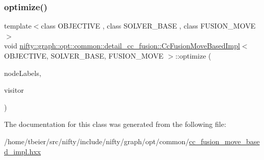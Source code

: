 \mbox{\label{classnifty_1_1graph_1_1opt_1_1common_1_1detail__cc__fusion_1_1CcFusionMoveBasedImpl_a7e5468a6297e5a7a3e859181a9897da5}} 
\subsubsection{\texorpdfstring{optimize()}{optimize()}}
{\footnotesize\ttfamily template$<$class O\+B\+J\+E\+C\+T\+I\+VE , class S\+O\+L\+V\+E\+R\+\_\+\+B\+A\+SE , class F\+U\+S\+I\+O\+N\+\_\+\+M\+O\+VE $>$ \\
void \hyperlink{classnifty_1_1graph_1_1opt_1_1common_1_1detail__cc__fusion_1_1CcFusionMoveBasedImpl}{nifty\+::graph\+::opt\+::common\+::detail\+\_\+cc\+\_\+fusion\+::\+Cc\+Fusion\+Move\+Based\+Impl}$<$ O\+B\+J\+E\+C\+T\+I\+VE, S\+O\+L\+V\+E\+R\+\_\+\+B\+A\+SE, F\+U\+S\+I\+O\+N\+\_\+\+M\+O\+VE $>$\+::optimize (\begin{DoxyParamCaption}\item[{\hyperlink{classnifty_1_1graph_1_1opt_1_1common_1_1detail__cc__fusion_1_1CcFusionMoveBasedImpl_a4bcaf3e64809f68b1713161641e66c64}{Node\+Labels\+Type} \&}]{node\+Labels,  }\item[{\hyperlink{classnifty_1_1graph_1_1opt_1_1common_1_1detail__cc__fusion_1_1CcFusionMoveBasedImpl_a0a1c77f29d556ed955a81473884e0d82}{Visitor\+Base\+Type} $\ast$}]{visitor }\end{DoxyParamCaption})\hspace{0.3cm}{\ttfamily [virtual]}}



The documentation for this class was generated from the following file\+:\begin{DoxyCompactItemize}
\item 
/home/tbeier/src/nifty/include/nifty/graph/opt/common/\hyperlink{cc__fusion__move__based__impl_8hxx}{cc\+\_\+fusion\+\_\+move\+\_\+based\+\_\+impl.\+hxx}\end{DoxyCompactItemize}
